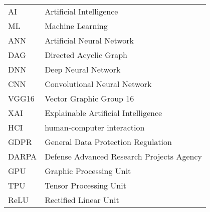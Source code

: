 %
%
%
%

\begin{acronyms}

\renewcommand{\arraystretch}{1.5}
\setlength{\tabcolsep}{3mm}
{\begin {tabular}{ll}

AI  &    Artificial Intelligence    \\
ML  &   Machine Learning    \\
ANN &   Artificial Neural Network   \\
DAG &   Directed Acyclic Graph  \\
DNN &   Deep Neural Network \\
CNN &   Convolutional Neural Network    \\
VGG16   &   Vector Graphic Group 16 \\
XAI &   Explainable Artificial Intelligence \\
HCI &   human-computer interaction  \\
GDPR    &   General Data Protection Regulation  \\
DARPA   &   Defense Advanced Research Projects Agency   \\
GPU &   Graphic Processing Unit \\
TPU &   Tensor Processing Unit  \\
ReLU    &   Rectified Linear Unit   \\

\end {tabular}}

\end{acronyms}

